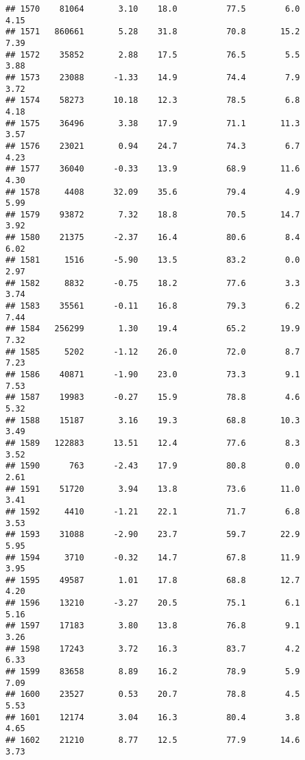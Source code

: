 \documentclass[
]{article}
\begin{document}
\begin{verbatim}
## 1570    81064       3.10    18.0          77.5        6.0              4.15
## 1571   860661       5.28    31.8          70.8       15.2              7.39
## 1572    35852       2.88    17.5          76.5        5.5              3.88
## 1573    23088      -1.33    14.9          74.4        7.9              3.72
## 1574    58273      10.18    12.3          78.5        6.8              4.18
## 1575    36496       3.38    17.9          71.1       11.3              3.57
## 1576    23021       0.94    24.7          74.3        6.7              4.23
## 1577    36040      -0.33    13.9          68.9       11.6              4.30
## 1578     4408      32.09    35.6          79.4        4.9              5.99
## 1579    93872       7.32    18.8          70.5       14.7              3.92
## 1580    21375      -2.37    16.4          80.6        8.4              6.02
## 1581     1516      -5.90    13.5          83.2        0.0              2.97
## 1582     8832      -0.75    18.2          77.6        3.3              3.74
## 1583    35561      -0.11    16.8          79.3        6.2              7.44
## 1584   256299       1.30    19.4          65.2       19.9              7.32
## 1585     5202      -1.12    26.0          72.0        8.7              7.23
## 1586    40871      -1.90    23.0          73.3        9.1              7.53
## 1587    19983      -0.27    15.9          78.8        4.6              5.32
## 1588    15187       3.16    19.3          68.8       10.3              3.49
## 1589   122883      13.51    12.4          77.6        8.3              3.52
## 1590      763      -2.43    17.9          80.8        0.0              2.61
## 1591    51720       3.94    13.8          73.6       11.0              3.41
## 1592     4410      -1.21    22.1          71.7        6.8              3.53
## 1593    31088      -2.90    23.7          59.7       22.9              5.95
## 1594     3710      -0.32    14.7          67.8       11.9              3.95
## 1595    49587       1.01    17.8          68.8       12.7              4.20
## 1596    13210      -3.27    20.5          75.1        6.1              5.16
## 1597    17183       3.80    13.8          76.8        9.1              3.26
## 1598    17243       3.72    16.3          83.7        4.2              6.33
## 1599    83658       8.89    16.2          78.9        5.9              7.09
## 1600    23527       0.53    20.7          78.8        4.5              5.53
## 1601    12174       3.04    16.3          80.4        3.8              4.65
## 1602    21210       8.77    12.5          77.9       14.6              3.73

\end{verbatim}
\end{document}
